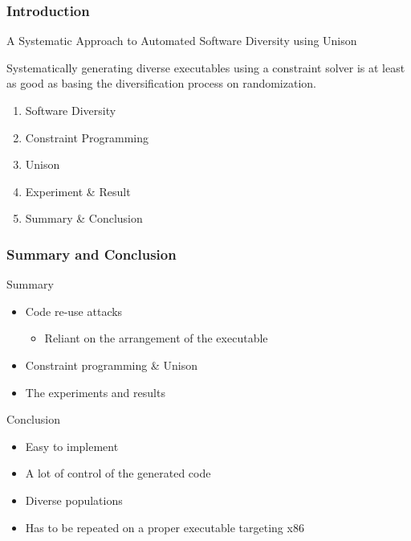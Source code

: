 \documentclass{beamer}
\begin{document}
\begin{frame}
	\frametitle{Introduction}

	A Systematic Approach to Automated Software Diversity using Unison

	\vspace{0.5cm}

	Systematically generating diverse executables using a constraint solver is at least as good as basing the diversification process on randomization.

	\begin{enumerate}
		\item Software Diversity
		\item Constraint Programming
		\item Unison
		\item Experiment \& Result
		\item Summary \& Conclusion
	\end{enumerate}

\end{frame}











\begin{frame}
	\frametitle{Summary and Conclusion}

	Summary
	\begin{itemize}
		\item Code re-use attacks
			\begin{itemize}
				\item Reliant on the arrangement of the executable
			\end{itemize}
		\item Constraint programming \& Unison
		\item The experiments and results
	\end{itemize}

	\vspace{0.5cm}
	
	Conclusion
	\begin{itemize}
		\item Easy to implement
		\item A lot of control of the generated code
		\item Diverse populations
		\item Has to be repeated on a proper executable targeting x86
	\end{itemize}

\end{frame}
\end{document}
